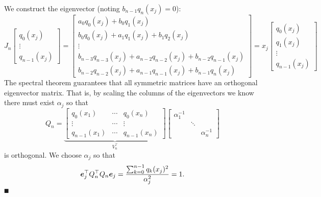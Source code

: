 We construct the eigenvector (noting $b_{n-1} q_n(x_j) = 0$):
\[
J_n \begin{bmatrix} q_0(x_j) \\ \ensuremath{\vdots} \\ q_{n-1}(x_j) \end{bmatrix} =
\begin{bmatrix} a_0 q_0(x_j) + b_0 q_1(x_j) \\
 b_0 q_0(x_j) + a_1 q_1(x_j) + b_1 q_2(x_j) \\
\ensuremath{\vdots} \\
b_{n-3} q_{n-3}(x_j) + a_{n-2} q_{n-2}(x_j) + b_{n-2} q_{n-1}(x_j) \\
b_{n-2} q_{n-2}(x_j) + a_{n-1} q_{n-1}(x_j) + b_{n-1} q_n(x_j)
\end{bmatrix} = x_j \begin{bmatrix} q_0(x_j) \\
 q_1(x_j) \\
\ensuremath{\vdots} \\
q_{n-1}(x_j)
\end{bmatrix}
\]
The spectral theorem guarantees that all symmetric matrices have an orthogonal eigenvector matrix.  That is, by scaling the columns of the eigenvectors we know there must exist $\ensuremath{\alpha}_j$ so that 
\[
Q_n = \underbrace{\begin{bmatrix}
q_0(x_1) & \ensuremath{\cdots} & q_0(x_n) \\
\ensuremath{\vdots}  & \ensuremath{\cdots} & \ensuremath{\vdots}  \\
q_{n-1}(x_1) & \ensuremath{\cdots} & q_{n-1}(x_n)
\end{bmatrix}}_{V_n^\ensuremath{\top}} \begin{bmatrix} \ensuremath{\alpha}_1^{-1} \\ & \ensuremath{\ddots} \\ && \ensuremath{\alpha}_n^{-1} \end{bmatrix}
\]
is orthogonal. We choose $\ensuremath{\alpha}_j$ so that
\[
\bm{{\mbox{\boldmath$e$\unboldmath}}}_j^\top Q_n^\top Q_n \bm{{\mbox{\boldmath$e$\unboldmath}}}_j = {\sum_{k=0}^{n-1} q_k(x_j)^2 \over \alpha_j^2} = 1.
\]
\ensuremath{\QED}

